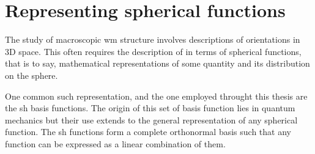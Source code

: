 
\section{Representing spherical functions}


The study of macroscopic \gls{wm} structure involves descriptions of orientations in 3D space.
This often requires the description of in terms of spherical functions, that is to say, mathematical representations of some quantity and its distribution on the sphere.

One common such representation, and the one employed throught this thesis are the \gls{sh} basis functions.
The origin of this set of basis function lies in quantum mechanics  but their use extends to the general representation of any spherical function.
The \gls{sh} functions form a complete orthonormal basis such that any  function can be expressed as a linear combination of them.

